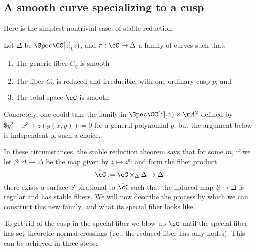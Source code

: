 \subsection{A smooth curve specializing to a cusp}

Here is  the simplest nontrivial case: of stable reduction:

Let $\Delta$ be $\Spec \CC[z]_(z)$, and $\pi : \cC \to \Delta$ a family of curves such that:
\begin{enumerate}
\item The generic fiber $C_\eta$ is smooth
\item The fiber $C_0$ is reduced and irreducible, with one ordinary cusp $p$; and
\item The total space $\cC$ is smooth.
\end{enumerate}

Concretely, one could take the family in $\Spec \CC[z]_(z) \times \AA^2$
defined by $\$y^2-x^3+z(g(x,y)) = 0$ for a general polynomial $g$; but the argument below is independent of such a choice.

In these circumstances, the stable reduction theorem says that for some $m$, if we let $\beta : \Delta \to \Delta$ be the map given by $z \mapsto z^m$ and form the fiber product
$$
\tilde \cC := \cC \times_\Delta \Delta \to \Delta
$$
there exists a surface $S$ birational to $\tilde \cC$ such that the induced map $S \to \Delta$ is regular and has stable fibers. We will now describe the process by which we can construct this new family, and what its special fiber looks like.


To get rid of the cusp in the special fiber we blow up $\cC$ until the special fiber has set-theoretic normal crossings (i.e., the reduced fiber has only nodes). This can be achieved in three steps:

